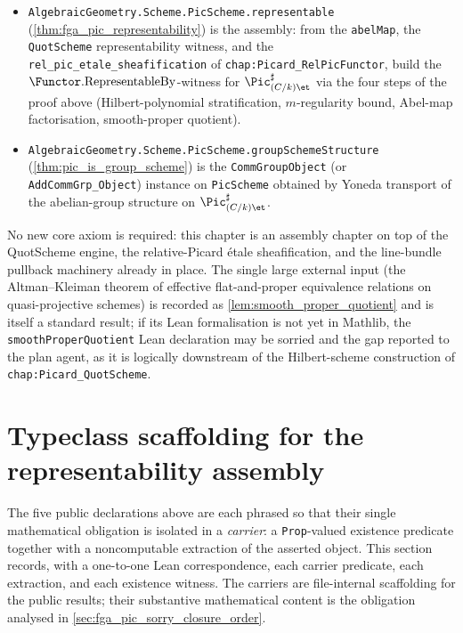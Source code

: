 \begin{itemize}
  \item \texttt{AlgebraicGeometry.Scheme.PicScheme.representable}
    (\cref{thm:fga_pic_representability}) is the assembly: from the
    \texttt{abelMap}, the \texttt{QuotScheme} representability witness,
    and the \texttt{rel\_pic\_etale\_sheafification} of
    \texttt{chap:Picard\_RelPicFunctor}, build the
    \(\Functor.\mathrm{RepresentableBy}\)-witness for
    \(\Pic^\sharp_{(C/k)\et}\) via the four steps of the proof above
    (Hilbert-polynomial stratification, \(m\)-regularity bound, Abel-map
    factorisation, smooth-proper quotient).
  \item \texttt{AlgebraicGeometry.Scheme.PicScheme.groupSchemeStructure}
    (\cref{thm:pic_is_group_scheme}) is the
    \texttt{CommGroupObject} (or
    \texttt{AddCommGrp\_Object}) instance on \texttt{PicScheme} obtained
    by Yoneda transport of the abelian-group structure on
    \(\Pic^\sharp_{(C/k)\et}\).
\end{itemize}

No new core axiom is required: this chapter is an assembly chapter on
top of the QuotScheme engine, the relative-Picard \'etale sheafification,
and the line-bundle pullback machinery already in place. The single
large external input (the Altman--Kleiman theorem of effective
flat-and-proper equivalence relations on quasi-projective schemes) is
recorded as \cref{lem:smooth_proper_quotient} and is itself a standard
result; if its Lean formalisation is not yet in Mathlib, the
\texttt{smoothProperQuotient} Lean declaration may be sorried and the
gap reported to the plan agent, as it is logically downstream of the
Hilbert-scheme construction of \texttt{chap:Picard\_QuotScheme}.

\section{Typeclass scaffolding for the representability assembly}
\label{sec:fga_pic_typeclass_scaffolding}

The five public declarations above are each phrased so that their single
mathematical obligation is isolated in a \emph{carrier}: a \texttt{Prop}-valued
existence predicate together with a noncomputable extraction of the asserted
object. This section records, with a one-to-one Lean correspondence, each
carrier predicate, each extraction, and each existence witness. The carriers
are file-internal scaffolding for the public results; their substantive
mathematical content is the obligation analysed in
\cref{sec:fga_pic_sorry_closure_order}.

